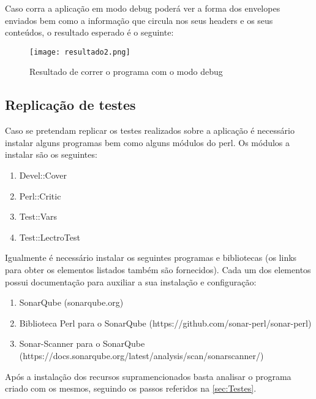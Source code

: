  Caso corra a aplicação em modo debug poderá ver a forma dos envelopes enviados bem como a informação que circula nos seus headers e os seus conteúdos, o resultado esperado é o seguinte:

\begin{figure}[H]

  \centering
  \captionsetup{justification=centering}

  \texttt{[image: resultado2.png]}
  
  \caption {Resultado de correr o programa com o modo debug}

\end{figure}
\newpage
\subsection{Replicação de testes}

Caso se pretendam replicar os testes realizados sobre a aplicação é necessário instalar alguns programas bem como alguns módulos do perl. Os módulos a instalar são os seguintes:

\begin{enumerate}
	\item Devel::Cover
	\item Perl::Critic
	\item Test::Vars
	\item Test::LectroTest
\end{enumerate}
Igualmente é necessário instalar os seguintes programas e bibliotecas (os links para obter os elementos listados também são fornecidos). Cada um dos elementos possui documentação para auxiliar a sua instalação e configuração:
\begin{enumerate}
	\item SonarQube (sonarqube.org)
	\item Biblioteca Perl para o SonarQube (https://github.com/sonar-perl/sonar-perl)
	\item Sonar-Scanner para o SonarQube (https://docs.sonarqube.org/latest/analysis/scan/sonarscanner/)
\end{enumerate}

Após a instalação dos recursos supramencionados basta analisar o programa criado com os mesmos, seguindo os passos referidos na \autoref{sec:Testes}.




